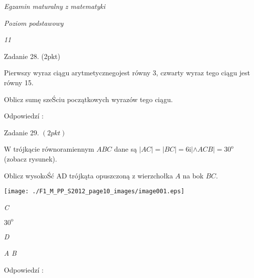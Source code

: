 \documentclass[a4paper,12pt]{article}
\begin{document}
{\it Egzamin maturalny z matematyki}

{\it Poziom podstawowy}

{\it 11}

Zadanie 28. (2pkt)

Pierwszy wyraz ciągu arytmetycznegojest równy 3, czwarty wyraz tego ciągu jest równy 15.

Oblicz sumę szeŚciu początkowych wyrazów tego ciągu.

Odpowiedzí :

Zadanie 29. $(2pkt)$

$\mathrm{W}$ trójkącie równoramiennym $ABC$ dane są $|AC|=|BC|=6 \mathrm{i}|\wedge ACB|=30^{\mathrm{o}}$ (zobacz rysunek).

Oblicz wysokoŚć AD trójkąta opuszczoną z wierzchołka $A$ na bok $BC.$
\begin{center}
\texttt{[image: ./F1\_M\_PP\_S2012\_page10\_images/image001.eps]}
\end{center}
{\it C}

$30^{\mathrm{o}}$

{\it D}

{\it A B}

Odpowiedzí :
\end{document}
